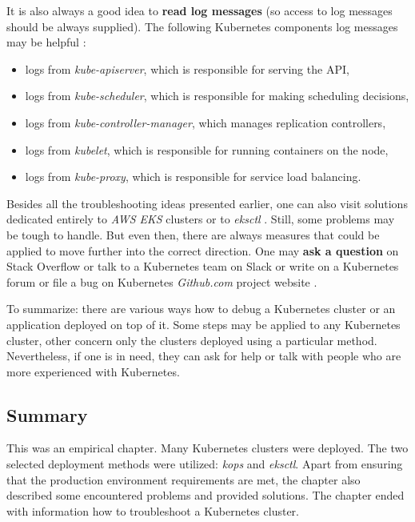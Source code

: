 It is also always a good idea to \textbf{read log messages} (so access to log messages should be always supplied). The following Kubernetes components log messages may be helpful \cite{k8s-deb-cluster}:
\begin{itemize}
\item logs from \textit{kube-apiserver}, which is responsible for serving the API,
\item logs from \textit{kube-scheduler}, which is responsible for making scheduling decisions,
\item logs from \textit{kube-controller-manager}, which manages replication controllers,
\item logs from \textit{kubelet}, which is responsible for running containers on the node,
\item logs from \textit{kube-proxy}, which is responsible for service load balancing.
\end{itemize}


Besides all the troubleshooting ideas presented earlier, one can also visit solutions dedicated entirely to \textit{AWS EKS} clusters \cite{k8s-eks-tr} or to \textit{eksctl} \cite{k8s-eksctl-tr}. Still, some problems may be tough to handle. But even then, there are always measures that could be applied to move further into the correct direction. One may \textbf{ask a question} on Stack Overflow or talk to a Kubernetes team on Slack or write on a Kubernetes forum or file a bug on Kubernetes \textit{Github.com} project website \cite{k8s-deb-ask}.

To summarize: there are various ways how to debug a Kubernetes cluster or an application deployed on top of it. Some steps may be applied to any Kubernetes cluster, other concern only the clusters deployed using a particular method. Nevertheless, if one is in need, they can ask for help or talk with people who are more experienced with Kubernetes.

\subsection{Summary}

This was an empirical chapter. Many Kubernetes clusters were deployed. The two selected deployment methods were utilized: \textit{kops} and \textit{eksctl}. Apart from ensuring that the production environment requirements are met, the chapter also described some encountered problems and provided solutions. The chapter ended with information how to troubleshoot a Kubernetes cluster.
